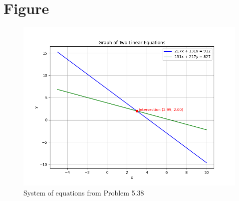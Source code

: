 \documentclass[journal]{IEEEtran}
\begin{document}
\vspace{0.4cm}
\newpage
\section*{\large\textbf{Figure}}

\begin{figure}[h!]
\centering
\includegraphics[width=0.85\linewidth]{Figs/Fig1.png}
\caption{System of equations from Problem 5.38}
\end{figure}
\end{document}
